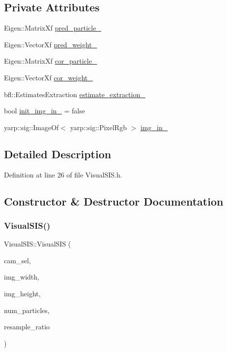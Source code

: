 \subsection*{Private Attributes}
\begin{DoxyCompactItemize}
\item 
Eigen\+::\+Matrix\+Xf \hyperlink{classVisualSIS_accd71e6f7ced897e5b61e3b6c01243d4}{pred\+\_\+particle\+\_\+}
\item 
Eigen\+::\+Vector\+Xf \hyperlink{classVisualSIS_aa0251c7dd7c4d13a849b051145dbcc78}{pred\+\_\+weight\+\_\+}
\item 
Eigen\+::\+Matrix\+Xf \hyperlink{classVisualSIS_ab2f16295dc79084196a8cb5db6a3696e}{cor\+\_\+particle\+\_\+}
\item 
Eigen\+::\+Vector\+Xf \hyperlink{classVisualSIS_a497a31b9417a12005b6253bc100ab476}{cor\+\_\+weight\+\_\+}
\item 
bfl\+::\+Estimates\+Extraction \hyperlink{classVisualSIS_a5052345aafc5e7efc7d72f1ccbf0a4ac}{estimate\+\_\+extraction\+\_\+}
\item 
bool \hyperlink{classVisualSIS_abe30d9bbca8a9f6fde0140c10451ad05}{init\+\_\+img\+\_\+in\+\_\+} = false
\item 
yarp\+::sig\+::\+Image\+Of$<$ yarp\+::sig\+::\+Pixel\+Rgb $>$ \hyperlink{classVisualSIS_adde5e15abd023e42e940a77e4d096ba5}{img\+\_\+in\+\_\+}
\end{DoxyCompactItemize}


\subsection{Detailed Description}


Definition at line 26 of file Visual\+S\+I\+S.\+h.



\subsection{Constructor \& Destructor Documentation}
\mbox{\label{classVisualSIS_a9088e9979575b7138557bbb02e81c59c}} 
\subsubsection{\texorpdfstring{Visual\+S\+I\+S()}{VisualSIS()}}
{\footnotesize\ttfamily Visual\+S\+I\+S\+::\+Visual\+S\+IS (\begin{DoxyParamCaption}\item[{const yarp\+::os\+::\+Const\+String \&}]{cam\+\_\+sel,  }\item[{const int}]{img\+\_\+width,  }\item[{const int}]{img\+\_\+height,  }\item[{const int}]{num\+\_\+particles,  }\item[{const double}]{resample\+\_\+ratio }\end{DoxyParamCaption})}



